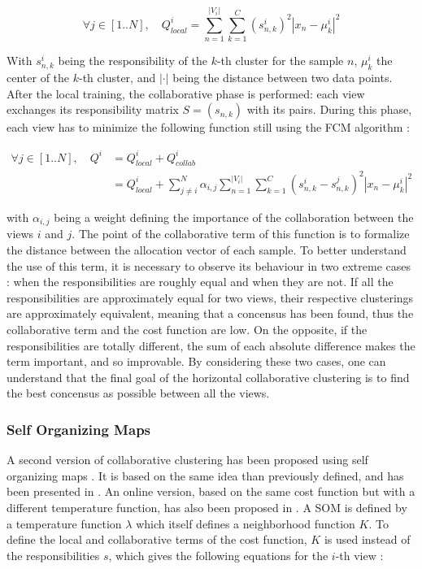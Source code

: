 \documentclass[a4paper]{report}
\begin{document}
    \begin{equation}
        \forall j \in [1..N], \quad Q^i_{local} = \sum_{n=1}^{|V_i|}\sum_{k=1}^C(s_{n,k}^i)^2|x_n - \mu_k^i|^2
        \label{eq:local_fcm}
    \end{equation}

    With $s_{n,k}^i$ being the responsibility of the $k$-th cluster for the sample $n$, $\mu_k^i$ the center of the $k$-th cluster, and $|\cdot|$ being the distance between two data points. After the local training, the collaborative phase is performed: each view exchanges its responsibility matrix $S = (s_{n,k})$ with its pairs. During this phase, each view has to minimize the following function still using the FCM algorithm :

    \begin{align}
        \forall j \in [1..N], \quad Q^i &= Q^i_{local} + Q^i_{collab}\\
        &= Q^i_{local} + \sum_{j\neq i}^N \alpha_{i,j}\sum_{n=1}^{|V_i|}\sum_{k=1}^C(s_{n,k}^i - s_{n,k}^j)^2|x_n-\mu_k^i|^2
    \end{align}
    
    with $\alpha_{i,j}$ being a weight defining the importance of the collaboration between the views $i$ and $j$. The point of the collaborative term of this function is to formalize the distance between the allocation vector of each sample. To better understand the use of this term, it is necessary to observe its behaviour in two extreme cases : when the responsibilities are roughly equal and when they are not. If all the responsibilities are approximately equal for two views, their respective clusterings are approximately equivalent, meaning that a concensus has been found, thus the collaborative term and the cost function are low. On the opposite, if the responsibilities are totally different, the sum of each absolute difference makes the term important, and so improvable. By considering these two cases, one can understand that the final goal of the horizontal collaborative clustering is to find the best concensus as possible between all the views.

    \subsubsection{Self Organizing Maps}

    A second version of collaborative clustering has been proposed using self organizing maps \cite{kohonen1998self}. It is based on the same idea than previously defined, and has been presented in \cite{grozavu2010topological}. An online version, based on the same cost function but with a different temperature function, has also been proposed in \cite{maurel2017incremental}. A SOM is defined by a temperature function $\lambda$ which itself defines a neighborhood function $K$. To define the local and collaborative terms of the cost function, $K$ is used instead of the responsibilities $s$, which gives the following equations for the $i$-th view :
\end{document}
